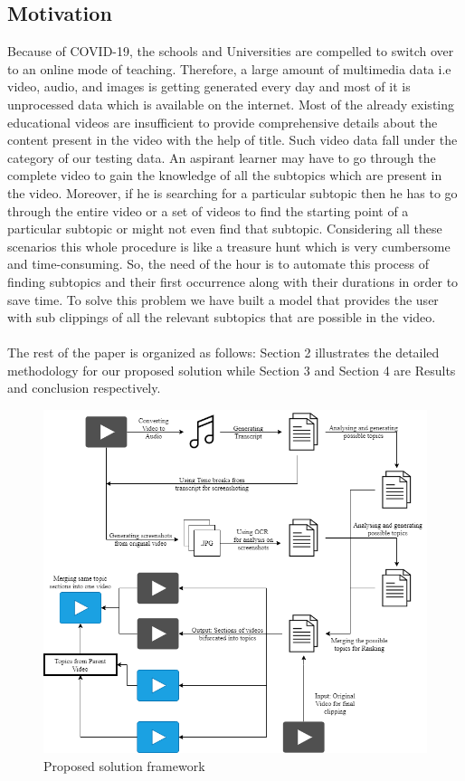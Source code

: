 \documentclass[conference]{IEEEtran}
\begin{document}
\subsection*{\textbf{Motivation}}
Because of COVID-19, the schools and Universities are compelled to switch over to an online mode of teaching. Therefore, a large amount of multimedia data i.e video, audio, and images is getting generated every day and most of it is unprocessed data which is available on the internet. Most of the already existing educational videos are insufficient to provide comprehensive details about the content present in the video with the help of title. Such video data fall under the category of our testing data. An aspirant learner may have to go through the complete video to gain the knowledge of all the subtopics which are present in the video. Moreover, if he is searching for a particular subtopic then he has to go through the entire video or a set of videos to find the starting point of a particular subtopic or might not even find that subtopic. Considering all these scenarios this whole procedure is like a treasure hunt which is very cumbersome and time-consuming. So, the need of the hour is to automate this process of finding subtopics and their first occurrence along with their durations in order to save time. To solve this problem we have built a model that provides the user with sub clippings of all the relevant subtopics that are possible in the video.\\
\\
The rest of the paper is organized as follows: Section 2 illustrates the detailed methodology for our proposed solution while Section 3 and Section 4 are Results and conclusion respectively.


\begin{figure}[h]
    \centering
    \includegraphics[width=\textwidth]{image2.png}
    \caption{Proposed solution framework}
    \label{fig:1}
\end{figure}
\end{document}
